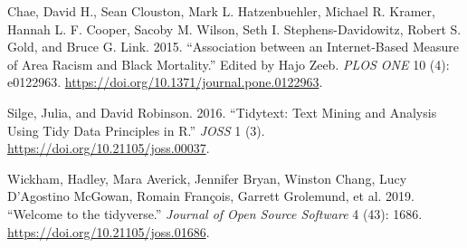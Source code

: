 \documentclass[
]{article}
\begin{document}
\hypertarget{refs}{}
\leavevmode\hypertarget{ref-journal}{}%
Chae, David H., Sean Clouston, Mark L. Hatzenbuehler, Michael R. Kramer, Hannah L. F. Cooper, Sacoby M. Wilson, Seth I. Stephens-Davidowitz, Robert S. Gold, and Bruce G. Link. 2015. ``Association between an Internet-Based Measure of Area Racism and Black Mortality.'' Edited by Hajo Zeeb. \emph{PLOS ONE} 10 (4): e0122963. \url{https://doi.org/10.1371/journal.pone.0122963}.

\leavevmode\hypertarget{ref-tidytext}{}%
Silge, Julia, and David Robinson. 2016. ``Tidytext: Text Mining and Analysis Using Tidy Data Principles in R.'' \emph{JOSS} 1 (3). \url{https://doi.org/10.21105/joss.00037}.

\leavevmode\hypertarget{ref-tidyverse}{}%
Wickham, Hadley, Mara Averick, Jennifer Bryan, Winston Chang, Lucy D'Agostino McGowan, Romain François, Garrett Grolemund, et al. 2019. ``Welcome to the tidyverse.'' \emph{Journal of Open Source Software} 4 (43): 1686. \url{https://doi.org/10.21105/joss.01686}.
\end{document}
